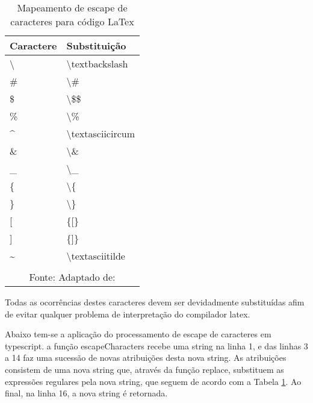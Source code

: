 \begin{table}[H]
    \centering
    \caption{Mapeamento de escape de caracteres para código LaTex}
    \label{tbl:escape-characters}
    \renewcommand{\arraystretch}{1.5}
    \begin{tabular}{p{2.5600cm} p{3.8400cm}}
        \hline
        \textbf{Caractere} & \textbf{Substituição} \\
        \hline
        \textbackslash  & \textbackslash textbackslash  \\
		\# & \textbackslash \# \\
		\$ & \textbackslash \$\$ \\
		\% & \textbackslash \% \\
		\textasciicircum  & \textbackslash textasciicircum  \\
		\& & \textbackslash \& \\
		\_ & \textbackslash \_ \\
		\{ & \textbackslash \{ \\
		\} & \textbackslash \} \\
		{[} & \{{[}\} \\
		{]} & \{{]}\} \\
		\textasciitilde  & \textbackslash textasciitilde  \\
        \hline
        \\\multicolumn{2}{c}{\fontsize{10pt}{12pt}Fonte: Adaptado de: \cite{tutorial-latex}}
    \end{tabular}
\end{table}

Todas as ocorrências destes caracteres devem ser devidadmente
substituídas afim de evitar qualquer problema de interpretação do
compilador
\acrshort{latex}.


Abaixo tem-se a aplicação do processamento de escape de caracteres
em typescript. a função escapeCharacters recebe uma string na linha 1,
e das linhas 3 a 14 faz uma sucessão de novas atribuições desta nova string.
As atribuições consistem de uma nova string que, através da função replace,
substituem as expressões regulares pela nova string, que seguem de acordo
com a
Tabela \ref{tbl:escape-characters}.
Ao final, na linha 16, a nova string é retornada.

